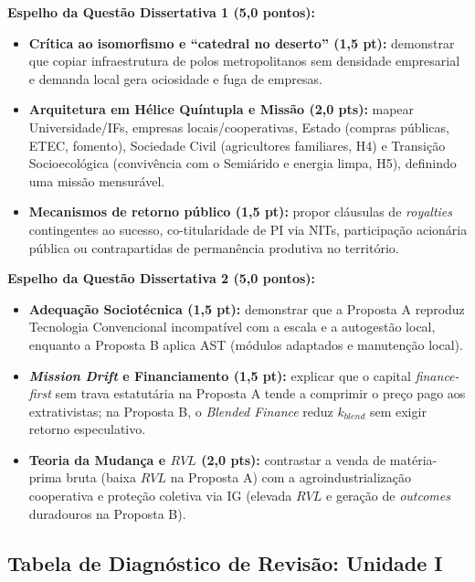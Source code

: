 \begin{boxGabarito}
\textbf{Espelho da Questão Dissertativa 1 (5,0 pontos):}
\begin{itemize}[leftmargin=1.4em, itemsep=2pt]
  \item \textbf{Crítica ao isomorfismo e ``catedral no deserto'' (1,5 pt):} demonstrar que copiar infraestrutura de polos metropolitanos sem densidade empresarial e demanda local gera ociosidade e fuga de empresas.
  \item \textbf{Arquitetura em Hélice Quíntupla e Missão (2,0 pts):} mapear Universidade/IFs, empresas locais/cooperativas, Estado (compras públicas, ETEC, fomento), Sociedade Civil (agricultores familiares, H4) e Transição Socioecológica (convivência com o Semiárido e energia limpa, H5), definindo uma missão mensurável.
  \item \textbf{Mecanismos de retorno público (1,5 pt):} propor cláusulas de \textit{royalties} contingentes ao sucesso, co-titularidade de PI via NITs, participação acionária pública ou contrapartidas de permanência produtiva no território.
\end{itemize}

\textbf{Espelho da Questão Dissertativa 2 (5,0 pontos):}
\begin{itemize}[leftmargin=1.4em, itemsep=2pt]
  \item \textbf{Adequação Sociotécnica (1,5 pt):} demonstrar que a Proposta A reproduz Tecnologia Convencional incompatível com a escala e a autogestão local, enquanto a Proposta B aplica AST (módulos adaptados e manutenção local).
  \item \textbf{\textit{Mission Drift} e Financiamento (1,5 pt):} explicar que o capital \textit{finance-first} sem trava estatutária na Proposta A tende a comprimir o preço pago aos extrativistas; na Proposta B, o \textit{Blended Finance} reduz $k_{blend}$ sem exigir retorno especulativo.
  \item \textbf{Teoria da Mudança e $RVL$ (2,0 pts):} contrastar a venda de matéria-prima bruta (baixa $RVL$ na Proposta A) com a agroindustrialização cooperativa e proteção coletiva via IG (elevada $RVL$ e geração de \textit{outcomes} duradouros na Proposta B).
\end{itemize}
\end{boxGabarito}

\subsection*{Tabela de Diagnóstico de Revisão: Unidade I}

